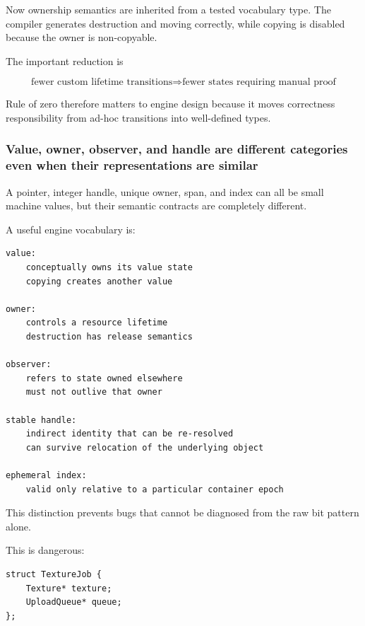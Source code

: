 Now ownership semantics are inherited from a tested vocabulary type. The compiler generates destruction and moving correctly, while copying is disabled because the owner is non-copyable.

The important reduction is

\[
\boxed{
\text{fewer custom lifetime transitions}
\Rightarrow
\text{fewer states requiring manual proof}
}
\]

Rule of zero therefore matters to engine design because it moves correctness responsibility from ad-hoc transitions into well-defined types.

\subsubsection{Value, owner, observer, and handle are different categories even when their representations are similar}\label{01-foundations-i-ch005-value-owner-observer-and-handle-are-different-categories-even-when-their-representations-are-similar}

\hypertarget{01-foundations-i-ch005-value-owner-observer-and-handle-are-different-categories-even-when-their-representations-are-similar}{}

A pointer, integer handle, unique owner, span, and index can all be small machine values, but their semantic contracts are completely different.

A useful engine vocabulary is:

\begin{verbatim}
value:
    conceptually owns its value state
    copying creates another value

owner:
    controls a resource lifetime
    destruction has release semantics

observer:
    refers to state owned elsewhere
    must not outlive that owner

stable handle:
    indirect identity that can be re-resolved
    can survive relocation of the underlying object

ephemeral index:
    valid only relative to a particular container epoch
\end{verbatim}

This distinction prevents bugs that cannot be diagnosed from the raw bit pattern alone.

This is dangerous:

\begin{verbatim}
struct TextureJob {
    Texture* texture;
    UploadQueue* queue;
};
\end{verbatim}

